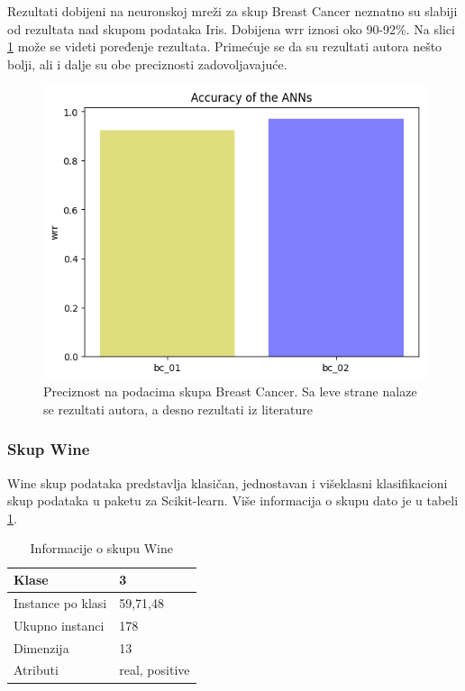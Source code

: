 \documentclass[a4paper]{article}
\begin{document}
{Rezultati dobijeni na neuronskoj mreži za skup Breast Cancer neznatno su slabiji od rezultata nad skupom podataka Iris.
Dobijena wrr iznosi oko 90-92\%. Na slici \ref{fig:breastslika} može se videti poređenje rezultata. Primećuje se da su 
rezultati autora \cite{hindawi} nešto bolji, ali i dalje su obe preciznosti zadovoljavajuće. 

\begin{figure}[H]
\centering
\captionsetup{justification=centering,margin=2cm}
\begin{center}
\includegraphics[scale=0.4]{img/bcwrr.png}
\end{center}
\caption{Preciznost na podacima skupa Breast Cancer. Sa leve strane nalaze se rezultati autora, a desno rezultati iz literature \cite{hindawi} }
\label{fig:breastslika}
\end{figure}

\subsubsection{Skup Wine}
\label{wine}

Wine skup podataka predstavlja klasičan, jednostavan i višeklasni klasifikacioni skup podataka u paketu za Scikit-learn. Više informacija o skupu dato je u tabeli \ref{table_wine}.

\begin{table}[h!]
\begin{center}
\caption{Informacije o skupu Wine}
\begin{tabular}{|p{4cm}|p{2cm}|}
\hline
Klase             & 3              \\ \hline
Instance po klasi & 59,71,48       \\ \hline
Ukupno instanci   & 178            \\ \hline
Dimenzija         & 13             \\ \hline
Atributi          & real, positive \\ \hline
\end{tabular}\par
\label{table_wine}
\bigskip
\end{center} 
\end{table}

}
\end{document}
